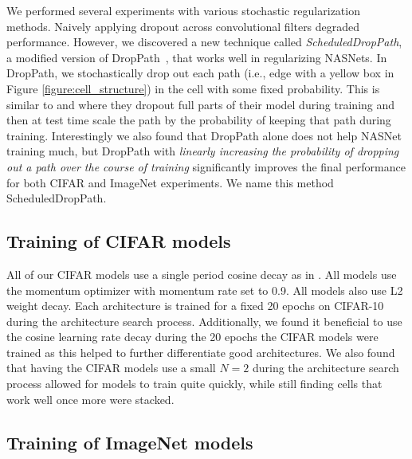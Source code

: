 \documentclass[10pt,twocolumn,letterpaper]{article}
\begin{document}
We performed several experiments with various stochastic regularization methods. Naively applying dropout \cite{srivastava2014dropout} across convolutional filters degraded performance. However,  we discovered a new technique called \emph{ScheduledDropPath}, a modified version of DropPath~\cite{larsson2016fractalnet}, that works well in regularizing NASNets. In DropPath, we stochastically drop out each path (i.e., edge with a yellow box in Figure \ref{figure:cell_structure}) in the cell with some fixed probability. This is similar to \cite{stochastic} and \cite{zhang2016polynet} where they dropout full parts of their model during training and then at test time scale the path by the probability of keeping that path during training. Interestingly we also found that DropPath alone does not help NASNet training much, but DropPath with \emph{linearly increasing the probability of dropping out a path over the course of training}  significantly improves the final performance for both CIFAR and ImageNet experiments. We name this method ScheduledDropPath.

\subsection{Training of CIFAR models}
All of our CIFAR models use a single period cosine decay as in \cite{loshchilov2016sgdr, gastaldi17shakeshake}.  All models use the momentum optimizer with momentum rate set to 0.9. All models also use L2 weight decay. Each architecture is trained for a fixed 20 epochs on CIFAR-10 during the architecture search process. Additionally, we found it beneficial to use the cosine learning rate decay during the 20 epochs the CIFAR models were trained as this helped to further differentiate good architectures. We also found that having the CIFAR models use a small $N=2$ during the architecture search process allowed for models to train quite quickly, while still finding cells that work well once more were stacked.

\subsection{Training of ImageNet models}
\end{document}
